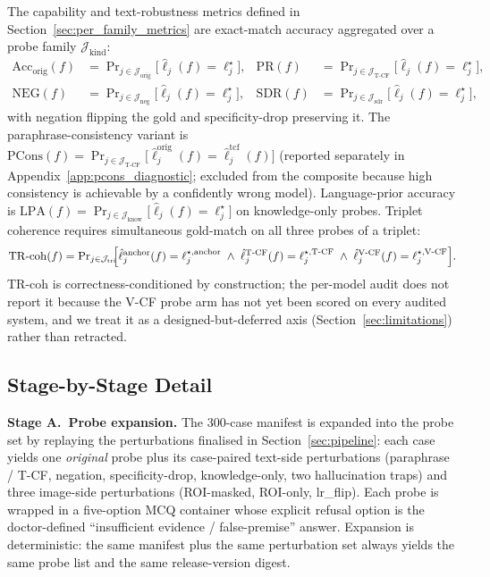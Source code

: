 \documentclass{article}
\begin{document}
The capability and text-robustness metrics defined in Section~\ref{sec:per_family_metrics} are exact-match accuracy aggregated over a probe family $\mathcal{J}_{\mathrm{kind}}$:
\begin{align}
  \mathrm{Acc}_{\mathrm{orig}}(f) &= \Pr\nolimits_{j\in\mathcal{J}_{\mathrm{orig}}}\!\!\bigl[\hat{\ell}_j(f)=\ell^{\star}_j\bigr], &
  \mathrm{PR}(f) &= \Pr\nolimits_{j\in\mathcal{J}_{\mathrm{T\text{-}CF}}}\!\!\bigl[\hat{\ell}_j(f)=\ell^{\star}_j\bigr], \nonumber\\
  \mathrm{NEG}(f) &= \Pr\nolimits_{j\in\mathcal{J}_{\mathrm{neg}}}\!\!\bigl[\hat{\ell}_j(f)=\ell^{\star}_j\bigr], &
  \mathrm{SDR}(f) &= \Pr\nolimits_{j\in\mathcal{J}_{\mathrm{sdr}}}\!\!\bigl[\hat{\ell}_j(f)=\ell^{\star}_j\bigr],
  \label{eq:cap_metrics}
\end{align}
with negation flipping the gold and specificity-drop preserving it. The paraphrase-consistency variant is $\mathrm{PCons}(f)=\Pr_{j\in\mathcal{J}_{\mathrm{T\text{-}CF}}}\!\bigl[\hat{\ell}^{\mathrm{orig}}_j(f)=\hat{\ell}^{\mathrm{tcf}}_j(f)\bigr]$ (reported separately in Appendix~\ref{app:pcons_diagnostic}; excluded from the composite because high consistency is achievable by a confidently wrong model). Language-prior accuracy is $\mathrm{LPA}(f)=\Pr_{j\in\mathcal{J}_{\mathrm{know}}}\!\bigl[\hat{\ell}_j(f)=\ell^{\star}_j\bigr]$ on knowledge-only probes. Triplet coherence requires simultaneous gold-match on all three probes of a triplet:
\begin{equation}
  \mathrm{TR\text{-}coh}(f) = \Pr\nolimits_{j\in\mathcal{J}_{\mathrm{tri}}}\!\!\Bigl[
    \hat{\ell}^{\mathrm{anchor}}_j(f)=\ell^{\star,\mathrm{anchor}}_j
    \;\wedge\;
    \hat{\ell}^{\mathrm{T\text{-}CF}}_j(f)=\ell^{\star,\mathrm{T\text{-}CF}}_j
    \;\wedge\;
    \hat{\ell}^{\mathrm{V\text{-}CF}}_j(f)=\ell^{\star,\mathrm{V\text{-}CF}}_j
  \Bigr].
  \label{eq:trcoh}
\end{equation}
TR-coh is correctness-conditioned by construction; the per-model audit does not report it because the V-CF probe arm has not yet been scored on every audited system, and we treat it as a designed-but-deferred axis (Section~\ref{sec:limitations}) rather than retracted.

\subsection{Stage-by-Stage Detail}

\textbf{Stage A.\ Probe expansion.} The 300-case manifest is expanded into the probe set by replaying the perturbations finalised in Section~\ref{sec:pipeline}: each case yields one \emph{original} probe plus its case-paired text-side perturbations (paraphrase / T-CF, negation, specificity-drop, knowledge-only, two hallucination traps) and three image-side perturbations (ROI-masked, ROI-only, lr\_flip). Each probe is wrapped in a five-option MCQ container whose explicit refusal option is the doctor-defined ``insufficient evidence / false-premise'' answer. Expansion is deterministic: the same manifest plus the same perturbation set always yields the same probe list and the same release-version digest.
\end{document}
